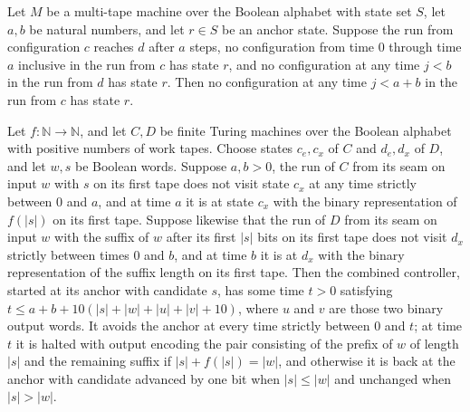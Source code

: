 \begin{lemma}
\label{Turing.FinTM.emitterP2_strict_join}
\leanok
{}
Let $M$ be a multi-tape machine over the Boolean alphabet with state set $S$, let $a,b$
be natural numbers, and let $r\in S$ be an anchor state. Suppose the run from
configuration $c$ reaches $d$ after $a$ steps, no configuration from time $0$ through
time $a$ inclusive in the run from $c$ has state $r$, and no configuration at any time
$j<b$ in the run from $d$ has state $r$. Then no configuration at any time $j<a+b$ in
the run from $c$ has state $r$.
\end{lemma}

\begin{lemma}
\label{Turing.FinTM.emitterP2_body_round}
\leanok
{}
Let $f:\mathbb N\to\mathbb N$, and let $C,D$ be finite Turing machines over the Boolean
alphabet with positive numbers of work tapes. Choose states $c_e,c_x$ of $C$ and
$d_e,d_x$ of $D$, and let $w,s$ be Boolean words. Suppose $a,b>0$, the run of $C$ from
its seam on input $w$ with $s$ on its first tape does not visit state $c_x$ at any time
strictly between $0$ and $a$, and at time $a$ it is at state $c_x$ with the binary
representation of $f(|s|)$ on its first tape. Suppose likewise that the run of $D$ from
its seam on input $w$ with the suffix of $w$ after its first $|s|$ bits on its first
tape does not visit $d_x$ strictly between times $0$ and $b$, and at time $b$ it is at
$d_x$ with the binary representation of the suffix length on its first tape. Then the
combined controller, started at its anchor with candidate $s$, has some time $t>0$
satisfying $t\le a+b+10(|s|+|w|+|u|+|v|+10)$, where $u$ and $v$ are those two binary
output words. It avoids the anchor at every time strictly between $0$ and $t$; at time
$t$ it is halted with output encoding the pair consisting of the prefix of $w$ of length
$|s|$ and the remaining suffix if $|s|+f(|s|)=|w|$, and otherwise it is back at the
anchor with candidate advanced by one bit when $|s|\le |w|$ and unchanged when
$|s|>|w|$.
\end{lemma}

